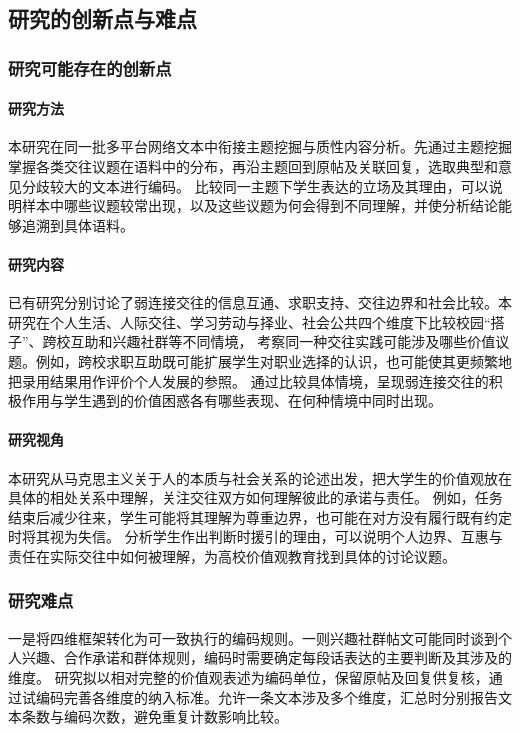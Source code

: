 \subsection{研究的创新点与难点}

\subsubsection{研究可能存在的创新点}

\paragraph{研究方法}
本研究在同一批多平台网络文本中衔接主题挖掘与质性内容分析。先通过主题挖掘掌握各类交往议题在语料中的分布，再沿主题回到原帖及关联回复，选取典型和意见分歧较大的文本进行编码。
比较同一主题下学生表达的立场及其理由，可以说明样本中哪些议题较常出现，以及这些议题为何会得到不同理解，并使分析结论能够追溯到具体语料。

\paragraph{研究内容}
已有研究分别讨论了弱连接交往的信息互通、求职支持、交往边界和社会比较。本研究在个人生活、人际交往、学习劳动与择业、社会公共四个维度下比较校园“搭子”、跨校互助和兴趣社群等不同情境，
考察同一种交往实践可能涉及哪些价值议题。例如，跨校求职互助既可能扩展学生对职业选择的认识，也可能使其更频繁地把录用结果用作评价个人发展的参照。
通过比较具体情境，呈现弱连接交往的积极作用与学生遇到的价值困惑各有哪些表现、在何种情境中同时出现。

\paragraph{研究视角}
本研究从马克思主义关于人的本质与社会关系的论述出发，把大学生的价值观放在具体的相处关系中理解，关注交往双方如何理解彼此的承诺与责任。
例如，任务结束后减少往来，学生可能将其理解为尊重边界，也可能在对方没有履行既有约定时将其视为失信。
分析学生作出判断时援引的理由，可以说明个人边界、互惠与责任在实际交往中如何被理解，为高校价值观教育找到具体的讨论议题。

\subsubsection{研究难点}

一是将四维框架转化为可一致执行的编码规则。一则兴趣社群帖文可能同时谈到个人兴趣、合作承诺和群体规则，编码时需要确定每段话表达的主要判断及其涉及的维度。
研究拟以相对完整的价值观表述为编码单位，保留原帖及回复供复核，通过试编码完善各维度的纳入标准。允许一条文本涉及多个维度，汇总时分别报告文本条数与编码次数，避免重复计数影响比较。

